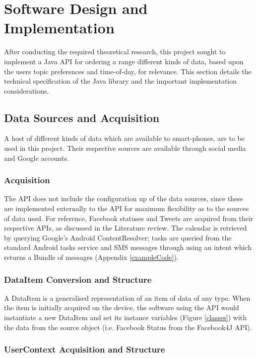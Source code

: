 \chapter{Software Design and Implementation}

After conducting the required theoretical research, this project sought to implement a Java API for ordering a range different kinds of data, based upon the users topic preferences and time-of-day, for relevance. This section details the technical specification of the Java library and the important implementation considerations.

\section{Data Sources and Acquisition}

A host of different kinds of data which are available to smart-phones, are to be used in this project. Their respective sources are available through social media and Google accounts. 

\subsection{Acquisition}

The API does not include the configuration up of the data sources, since these are implemented externally to the API for maximum flexibility as to the sources of data used. For reference, Facebook statuses \cite{Facebook4JExample} and Tweets \cite{Twitter4JExample} are acquired from their respective APIs, as discussed in the Literature review. The calendar is retrieved by querying Google's Android ContentResolver; tasks are queried from the standard Android tasks service and SMS messages through using an intent which returns a Bundle of messages (Appendix \ref{exampleCode}). 

\subsection{DataItem Conversion and Structure}

A DataItem is a generalised representation of an item of data of any type. When the item is initially acquired on the device, the software using the API would instantiate a new DataItem and set its instance variables (Figure \ref{classes}) with the data from the source object (i.e. Facebook Status from the Facebook4J API). 

\subsection{UserContext Acquisition and Structure}

